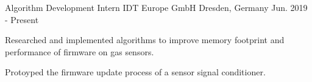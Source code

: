 

\begin{cventries}

  \cventry
    {Algorithm Development Intern} %
    {IDT Europe GmbH} %
    {Dresden, Germany} %
    {Jun. 2019 - Present} %
    {
      \begin{cvitems} %
        \item {Researched and implemented algorithms to improve memory footprint and performance of firmware on gas sensors.}
        \item {Protoyped the firmware update process of a sensor signal conditioner.}
      \end{cvitems}
    }
\end{cventries}
